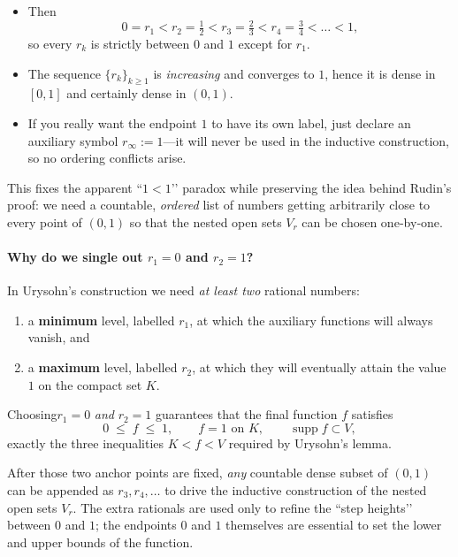 \documentclass[12pt]{article}
\theoremstyle{definition} %
\theoremstyle{plain} %
\begin{document}
\begin{itemize}
\item Then
      \[
          0=r_1 < r_2=\tfrac12 < r_3=\tfrac23 < r_4=\tfrac34 < \dots < 1,
      \]
      so every $r_k$ is strictly between $0$ and $1$ except for $r_1$.
\item The sequence $\{r_k\}_{k\ge 1}$ is \emph{increasing} and
      converges to $1$, hence it is dense in $[0,1]$ and
      certainly dense in $(0,1)$.
\item If you really want the endpoint $1$ to have its own label,
      just declare an auxiliary symbol $r_\infty:=1$—it will never be
      used in the inductive construction, so no ordering conflicts arise.
\end{itemize}

This fixes the apparent “$1<1$’’ paradox while preserving the idea
behind Rudin’s proof: we need a countable, \emph{ordered} list of numbers
getting arbitrarily close to every point of $(0,1)$ so that the nested
open sets \(V_r\) can be chosen one‐by‐one.
\pagebreak
\paragraph{Why do we single out $r_1=0$ and $r_2=1$?}

In Urysohn’s construction we need \emph{at least two} rational numbers:

\begin{enumerate}
    \item  a \textbf{minimum} level, labelled $r_1$, at which the auxiliary functions will always vanish, and
    \item  a \textbf{maximum} level, labelled $r_2$, at which they will eventually attain the value $1$ on the compact set $K$.
\end{enumerate}

Choosing\;\;$r_1=0$ \emph{and}\; $r_2=1$ guarantees that the final function $f$ satisfies
\[
   0\;\le\;f\;\le\;1,
   \qquad
   f=1 \text{ on }K,
   \qquad
   \operatorname{supp}f\subset V,
\]
exactly the three inequalities $K<f<V$ required by Urysohn’s lemma.

After those two anchor points are fixed, \emph{any} countable dense
subset of $(0,1)$ can be appended as $r_3,r_4,\dots$ to drive the
inductive construction of the nested open sets $V_r$.  The extra
rationals are used only to refine the “step heights’’ between $0$ and
$1$; the endpoints $0$ and $1$ themselves are essential to set the lower
and upper bounds of the function.
\pagebreak
\end{document}
